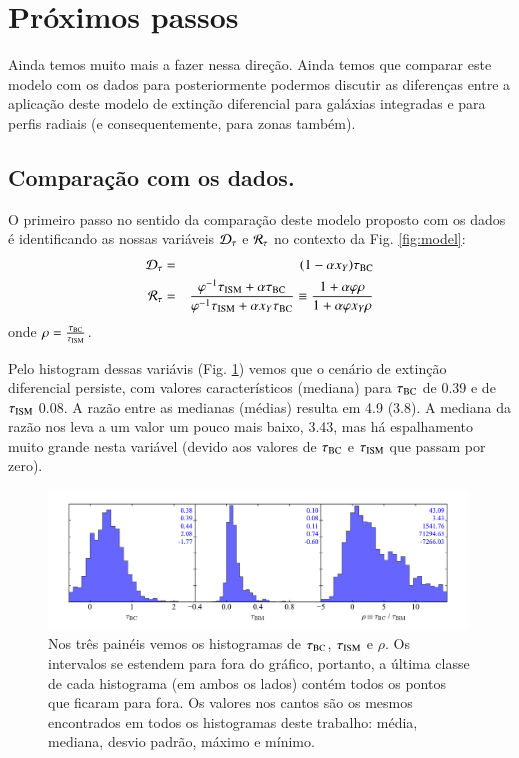 \section{Próximos passos}
\label{sec:difextin:nextsteps}

Ainda temos muito mais a fazer nessa direção. Ainda temos que comparar este modelo com os dados
para posteriormente podermos discutir as diferenças entre a aplicação deste modelo de extinção
diferencial para galáxias integradas e para perfis radiais (e consequentemente, para zonas também).

\subsection{Comparação com os dados.}
\label{sec:difextin:nextsteps:comp}

O primeiro passo no sentido da comparação deste modelo proposto com os dados é identificando as
nossas variáveis $\mathcal{D}_\tau$ e $\mathcal{R}_\tau$ no contexto da Fig. \ref{fig:model}:
\begin{eqnarray}
	\mathcal{D}_\tau &=& (1 - \alpha x_Y) \tau_{\mathrm{BC}} \\
	\label{eq:DtauxY}
	\mathcal{R}_\tau &=& \frac{\varphi^{-1} \tau_{\mathrm{ISM}} + \alpha \tau_{\mathrm{BC}}}{\varphi^{-1} \tau_{\mathrm{ISM}} + \alpha x_Y \tau_{\mathrm{BC}}}
\equiv \frac{1 + \alpha \varphi \rho}{1 + \alpha \varphi x_Y \rho}
	\label{eq:RtauxY}
\end{eqnarray}
\noindent onde $\rho = \frac{\tau_{\mathrm{BC}}}{\tau_{\mathrm{ISM}}}$. 

Pelo histogram dessas variávis (Fig. \ref{fig:tauBCISM}) vemos que o cenário de extinção diferencial
persiste, com valores característicos (mediana) para $\tauBC$ de 0.39 e de $\tauISM$ 0.08. A razão
entre as medianas (médias) resulta em 4.9 (3.8). A mediana da razão nos leva a um valor um pouco
mais baixo, 3.43, mas há espalhamento muito grande nesta variável (devido aos valores de $\tauBC$ e
$\tauISM$ que passam por zero). 

\begin{figure}
	\centering
	\includegraphics[width=0.99\textwidth]{figuras/tauISMBC_R.pdf}
	\caption[Histogramas de $\tauBC$, $\tauISM$ e $\rho$.]
	{Nos três painéis vemos os histogramas de $\tauBC$, $\tauISM$ e $\rho$. Os intervalos se estendem
para fora do gráfico, portanto, a última classe de cada histograma (em ambos os lados) contém todos
os pontos que ficaram para fora. Os valores nos cantos são os mesmos encontrados em todos os
histogramas deste trabalho: média, mediana, desvio padrão, máximo e mínimo.}
	\label{fig:tauBCISM}
\end{figure}

